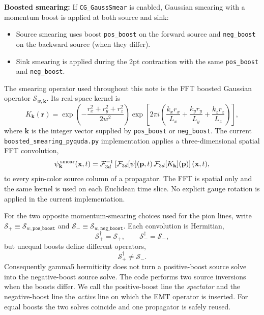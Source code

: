 \documentclass[11pt,a4paper]{article}
\newcommand{\code}[1]{\texttt{#1}}
\begin{document}
\textbf{Boosted smearing:} If \code{CG\_GaussSmear} is enabled, Gaussian smearing with a momentum boost is applied at both source and sink:
\begin{itemize}[nosep]
  \item Source smearing uses boost \code{pos\_boost} on the forward source and \code{neg\_boost} on the backward source (when they differ).
  \item Sink smearing is applied during the 2pt contraction with the same \code{pos\_boost} and \code{neg\_boost}.
\end{itemize}
The smearing operator used throughout this note is the FFT boosted Gaussian
operator \(\mathcal{S}_{w,\mathbf{k}}\).  Its real-space kernel is
\begin{equation}\label{eq:emt_smear_kernel}
  K_{\mathbf{k}}(\mathbf{r})
  =
  \exp\!\left(-\frac{r_x^2+r_y^2+r_z^2}{2w^2}\right)
  \exp\!\left[
    2\pi i
    \left(
      \frac{k_x r_x}{L_x}
      + \frac{k_y r_y}{L_y}
      + \frac{k_z r_z}{L_z}
    \right)
  \right],
\end{equation}
where \(\mathbf{k}\) is the integer vector supplied by \code{pos\_boost} or
\code{neg\_boost}.  The current \code{boosted\_smearing\_pyquda.py}
implementation applies a three-dimensional spatial FFT convolution,
\begin{equation}\label{eq:emt_fft_smear}
  \psi^{\,{\rm smear}}_{\mathbf{k}}(\mathbf{x},t)
  =
  \mathcal{F}^{-1}_{3d}
  \left[
    \mathcal{F}_{3d}[\psi](\mathbf{p},t)\,
    \mathcal{F}_{3d}[K_{\mathbf{k}}](\mathbf{p})
  \right](\mathbf{x},t),
\end{equation}
to every spin-color source column of a propagator.  The FFT is spatial only and
the same kernel is used on each Euclidean time slice.  No explicit gauge
rotation is applied in the current implementation.

For the two opposite momentum-smearing choices used for the pion lines, write
\(\mathcal S_+\equiv\mathcal S_{w,\mathtt{pos\_boost}}\) and
\(\mathcal S_-\equiv\mathcal S_{w,\mathtt{neg\_boost}}\).  Each convolution
is Hermitian,
\begin{equation}
  \mathcal S_+^\dagger=\mathcal S_+,
  \qquad
  \mathcal S_-^\dagger=\mathcal S_-,
\end{equation}
but unequal boosts define different operators,
\begin{equation}
  \mathcal S_+^\dagger\ne\mathcal S_-.
\end{equation}
Consequently gamma5 hermiticity does not turn a positive-boost source solve
into the negative-boost source solve.  The code performs two source inversions
when the boosts differ.  We call the positive-boost line the
\emph{spectator} and the negative-boost line the \emph{active} line on which
the EMT operator is inserted.  For equal boosts the two solves coincide and
one propagator is safely reused.
\end{document}
